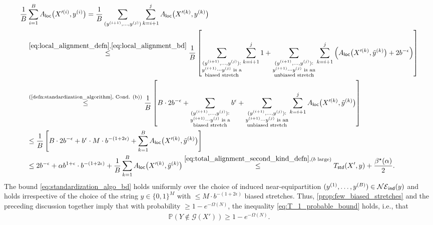 \documentclass[11pt]{amsart}
\numberwithin{equation}{section}
\numberwithin{equation}{section}
\newcommand{\1}{\mathbbm{1}}
\newcommand{\Prob}{\mathbb{P}}
\newcommand{\ind}{\textup{\textsf{ind}}}
\newcommand{\std}{\textup{\textsf{std}}}
\newcommand{\loc}{\textup{\textsf{loc}}}
\theoremstyle{definition}
\begin{document}
\begin{align}
    & \frac{1}{B} \sum_{i=1}^B A_\loc\big(X'^{(i)}, y^{(i)} \big) = \frac{1}{B} \sum_{(y^{(i+1)}, \dots, y^{(j)})} \sum_{k=i+1}^j A_\loc\big(X'^{(k)}, y^{(k)}\big) \nonumber \\
    & \quad \stackrel{\eqref{eq:local_alignment_defn}, \eqref{eq:local_alignment_bd}}{\leq} \frac{1}{B} \left[ \sum_{\substack{(y^{(i+1)},\dots,y^{(j)}):\\ y^{(i+1)}\cdots y^{(j)}\text{ is a}\\ \text{biased stretch}}} \sum_{k=i+1}^j 1 + \sum_{\substack{(y^{(i+1)},\dots,y^{(j)}):\\ y^{(i+1)}\cdots y^{(j)}\text{ is an}\\ \text{unbiased stretch}}} \sum_{k=i+1}^j \left( A_\loc\big(X'^{(k)}, \tilde{y}^{(k)}\big) + 2b^{-\epsilon} \right) \right] \nonumber \\
    & \quad \stackrel{\text{(\cref{defn:standardization_algorithm}, Cond. (b))}}{\leq} \frac{1}{B} \left[ B \cdot 2b^{-\epsilon} + \sum_{\substack{(y^{(i+1)},\dots,y^{(j)}):\\ y^{(i+1)}\cdots y^{(j)}\text{ is a}\\ \text{biased stretch}}} b^\epsilon + \sum_{\substack{(y^{(i+1)},\dots,y^{(j)}):\\ y^{(i+1)}\cdots y^{(j)}\text{ is an}\\ \text{unbiased stretch}}} \sum_{k=i+1}^j A_\loc\big(X'^{(k)}, \tilde{y}^{(k)}\big) \right] \nonumber \\
    & \quad \leq \frac{1}{B} \left[ B \cdot 2b^{-\epsilon} + b^\epsilon \cdot M \cdot b^{-(1+2\epsilon)} + \sum_{k=1}^B A_\loc\big(X'^{(k)}, \tilde{y}^{(k)}\big) \right] \nonumber \\
    & \quad \leq 2b^{-\epsilon} + \alpha b^{1+\epsilon} \cdot b^{-(1+2\epsilon)} + \frac{1}{B}\sum_{k=1}^B A_\loc\big(X'^{(k)}, \tilde{y}^{(k)}\big)\stackrel{\eqref{eq:total_alignment_second_kind_defn}, \text{($b$ large)}}{\leq} T_\std(X', y) + \frac{\beta^\star(\alpha)}{2}. \label{eq:standardization_algo_bd}
\end{align}
The bound \eqref{eq:standardization_algo_bd} holds uniformly over the choice of induced near-equipartition $(y^{(1)}, \dots, y^{(B)}) \in \mathcal{NE}_\ind(y)$ and holds irrespective of the choice of the string $y \in \{0,1\}^M$ with $\leq M \cdot b^{-(1+2\epsilon)}$ biased stretches. Thus, \cref{prop:few_biased_stretches} and the preceding discussion together imply that with probability $\geq 1 - e^{-\Omega(N)}$, the inequality \eqref{eq:T_1_probable_bound} holds, i.e., that
\begin{align} \label{eq:Y_not_in_good_set}
    \Prob\left( Y \notin \mathcal G\left( X' \right) \right) \geq 1 - e^{-\Omega(N)}.
\end{align}
\end{document}
